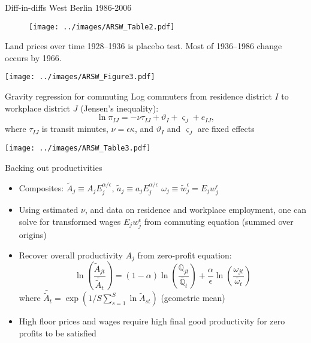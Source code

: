 \documentclass[11pt,notes=hide,aspectratio=169]{beamer}
\begin{document}
\begin{frame}{Diff-in-diffs West Berlin 1986-2006}
\begin{figure}
\centering
\texttt{[image: ../images/ARSW\_Table2.pdf]}
\end{figure}
\end{frame}
\begin{frame}{Land prices over time}
1928--1936 is placebo test.
Most of 1936--1986 change occurs by 1966.
\begin{center}
\texttt{[image: ../images/ARSW\_Figure3.pdf]}
\end{center}
\end{frame}
\begin{frame}{Gravity regression for commuting}
\vspace{-2mm}
Log commuters from residence district $I$ to workplace district $J$ (Jensen's inequality):
\begin{equation*}
\ln \pi_{IJ} = - \nu \tau_{IJ}  + \vartheta_{I} + \varsigma_{J} + e_{IJ},
\end{equation*}
where $\tau_{IJ}$ is transit minutes, $\nu = \epsilon \kappa$, and 
$\vartheta_{I}$ and  $\varsigma_{J}$ are fixed effects
\begin{center}
\texttt{[image: ../images/ARSW\_Table3.pdf]}
\end{center}
\end{frame}
\begin{frame}{Backing out productivities}
\begin{itemize}
\item Composites:
$\tilde{A}_{j} \equiv A_j E_j^{\alpha/\epsilon}$,
$\tilde{a}_{j} \equiv a_j E_j^{\alpha/\epsilon}$
$\omega_{j} \equiv \tilde{w}_{j}^{\epsilon} = E_j w_{j}^{\epsilon}$
\item Using estimated $\nu$, and data on residence and workplace employment, one can solve for transformed wages $E_j w_{j}^{\epsilon}$ from commuting equation (summed over origins)
\item Recover overall productivity $A_{j}$ from zero-profit equation:
\begin{equation*}
\ln\left(\frac{\tilde{A}_{jt}}{\bar{\tilde{A}}_{t}} \right) = (1-\alpha) \ln \left(\frac{\mathbb{Q}_{jt}}{\bar{\mathbb{Q}}_t} \right) + \frac{\alpha}{\epsilon} \ln \left(\frac{\omega_{jt}}{\bar{\omega}_t} \right)
\end{equation*}
where $\bar{\tilde{A}}_t = \exp(1/S \sum_{s=1}^{S} \ln \tilde{A}_{st})$ (geometric mean)
\item High floor prices and wages require high final good productivity for zero profits to be satisfied 
\end{itemize}
\end{frame}
\end{document}

